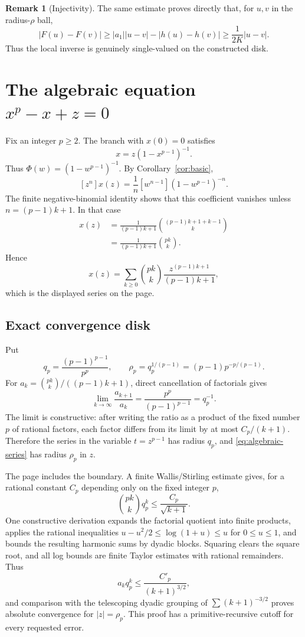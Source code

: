 \documentclass[11pt]{article}
\theoremstyle{definition}
\newtheorem{remark}[theorem]{Remark}
\begin{document}
\begin{remark}[Injectivity]
The same estimate proves directly that, for \(u,v\) in the radius-\(\rho\)
ball,
\[
 |F(u)-F(v)|\ge |a_1||u-v|-|h(u)-h(v)|
 \ge\frac1{2K}|u-v|.
\]
Thus the local inverse is genuinely single-valued on the constructed disk.
\end{remark}

\section{The algebraic equation \(x^p-x+z=0\)}\label{sec:algebraic-example}

Fix an integer \(p\ge2\).  The branch with \(x(0)=0\) satisfies
\[
 x=z(1-x^{p-1})^{-1}.
\]
Thus \(\Phi(w)=(1-w^{p-1})^{-1}\).  By
Corollary~\ref{cor:basic},
\[
 [z^n]x(z)=\frac1n[w^{n-1}](1-w^{p-1})^{-n}.
\]
The finite negative-binomial identity shows that this coefficient vanishes
unless \(n=(p-1)k+1\).  In that case
\begin{align*}
 [z^{(p-1)k+1}]x(z)
 &=\frac1{(p-1)k+1}
   \binom{(p-1)k+1+k-1}{k}\\
 &=\frac1{(p-1)k+1}\binom{pk}{k}.
\end{align*}
Hence
\begin{equation}\label{eq:algebraic-series}
 x(z)=\sum_{k\ge0}\binom{pk}{k}
       \frac{z^{(p-1)k+1}}{(p-1)k+1},
\end{equation}
which is the displayed series on the page.

\subsection{Exact convergence disk}

Put
\[
 q_p=\frac{(p-1)^{p-1}}{p^p},
 \qquad \rho_p=q_p^{1/(p-1)}=(p-1)p^{-p/(p-1)}.
\]
For
\(a_k=\binom{pk}{k}/((p-1)k+1)\), direct cancellation of factorials gives
\[
 \lim_{k\to\infty}\frac{a_{k+1}}{a_k}
 =\frac{p^p}{(p-1)^{p-1}}=q_p^{-1}.
\]
The limit is constructive: after writing the ratio as a product of the fixed
number \(p\) of rational factors, each factor differs from its limit by at most
\(C_p/(k+1)\).  Therefore the series in the variable
\(t=z^{p-1}\) has radius \(q_p\), and \eqref{eq:algebraic-series} has radius
\(\rho_p\) in \(z\).

The page includes the boundary.  A finite Wallis/Stirling estimate gives, for
a rational constant \(C_p\) depending only on the fixed integer \(p\),
\begin{equation}\label{eq:alg-boundary}
 \binom{pk}{k}q_p^k\le\frac{C_p}{\sqrt{k+1}}.
\end{equation}
One constructive derivation expands the factorial quotient into finite products,
applies the rational inequalities
\(u-u^2/2\le\log(1+u)\le u\) for \(0\le u\le1\), and bounds the resulting
harmonic sums by dyadic blocks.  Squaring clears the square root, and all log
bounds are finite Taylor estimates with rational remainders.  Thus
\[
 a_kq_p^k\le\frac{C'_p}{(k+1)^{3/2}},
\]
and comparison with the telescoping dyadic grouping of
\(\sum(k+1)^{-3/2}\) proves absolute convergence for \(|z|=\rho_p\).  This
proof has a primitive-recursive cutoff for every requested error.
\end{document}
